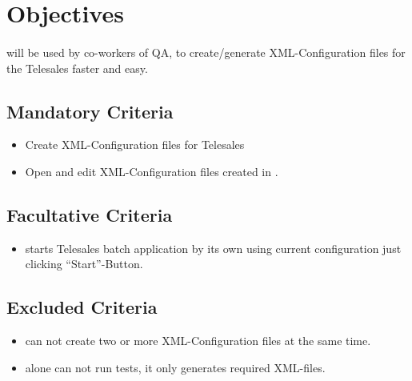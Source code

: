 \section{Objectives}

\paragraph{}\app{} will be used by co-workers of QA, to create/generate XML-Configuration files for the Telesales faster and easy.

\subsection{Mandatory Criteria}

\begin{itemize}
\item Create XML-Configuration files for Telesales
\item Open and edit XML-Configuration files created in \app{}.
\end{itemize}

\subsection{Facultative Criteria}

\begin{itemize}
\item \app{} starts Telesales batch application by its own using current configuration just clicking ``Start''-Button.
\end{itemize}

\subsection{Excluded Criteria}

\begin{itemize}
\item \app{} can not create two or more XML-Configuration files at the same time.
\item \app{} alone can not run tests, it only generates required XML-files.
\end{itemize}
